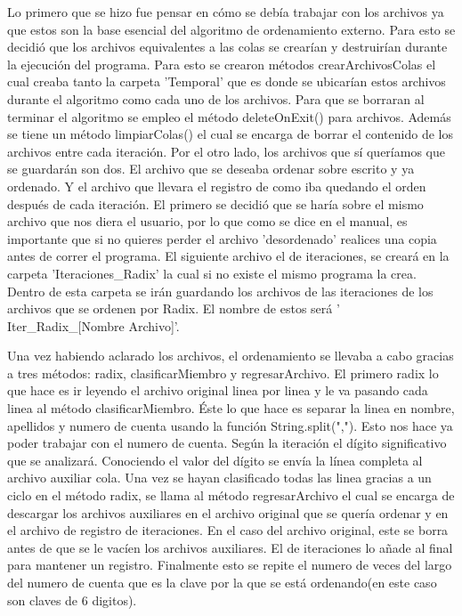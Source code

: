 \documentclass[letter]{report}
\begin{document}
Lo primero que se hizo fue pensar en cómo se debía trabajar con los archivos ya que estos son la base esencial del algoritmo de ordenamiento externo. Para esto se decidió que los archivos equivalentes a las colas se crearían y destruirían durante la ejecución del programa. Para esto se crearon métodos crearArchivosColas el cual creaba tanto la carpeta 'Temporal' que es donde se ubicarían estos archivos durante el algoritmo como cada uno de los archivos. Para que se borraran al terminar el algoritmo se empleo el método deleteOnExit() para archivos. Además se tiene un método limpiarColas() el cual se encarga de borrar el contenido de los archivos entre cada iteración. Por el otro lado, los archivos que sí queríamos que se guardarán son dos. El archivo que se deseaba ordenar sobre escrito y ya ordenado. Y el archivo que llevara el registro de como iba quedando el orden después de cada iteración. El primero se decidió que se haría sobre el mismo archivo que nos diera el usuario, por lo que como se dice en el manual, es importante que si no quieres perder el archivo  'desordenado' realices una copia antes de correr el programa. El siguiente archivo el de iteraciones, se creará en la carpeta 'Iteraciones\_Radix' la cual si no existe el mismo programa la crea. Dentro de esta carpeta se irán guardando los archivos de las iteraciones de los archivos que se ordenen por Radix. El nombre de estos será ' Iter\_Radix\_[Nombre Archivo]'.\medskip

Una vez habiendo aclarado los archivos, el ordenamiento se llevaba a cabo gracias a tres métodos: radix,  clasificarMiembro y regresarArchivo. El primero radix lo que hace es ir leyendo el archivo original linea por linea y le va pasando cada linea al método clasificarMiembro. Éste lo que hace es separar la linea en nombre, apellidos y numero de cuenta usando la función String.split(","). Esto nos hace ya poder trabajar con el numero de cuenta. Según la iteración el dígito significativo que se analizará. Conociendo el valor del dígito se envía la línea completa al archivo auxiliar cola. Una vez se hayan clasificado todas las linea gracias a un ciclo en el método radix, se llama al método regresarArchivo el cual se encarga de descargar los archivos auxiliares en el archivo original que se quería ordenar y en el archivo de registro de iteraciones. En el caso del archivo original, este se borra antes de que se le vacíen los archivos auxiliares. El de iteraciones lo añade al final para mantener un registro. Finalmente esto se repite el numero de veces del largo del numero de cuenta que es la clave por la que se está ordenando(en este caso son claves de 6 digitos).\medskip
\end{document}
